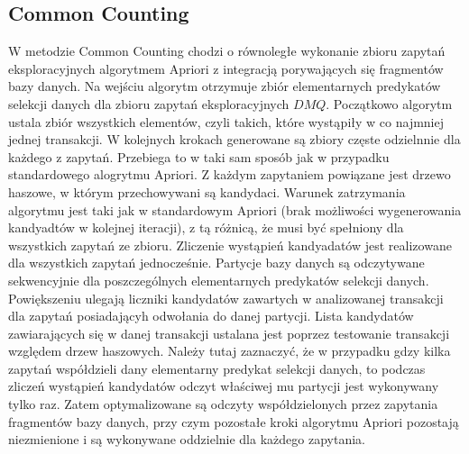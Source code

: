 \subsection{Common Counting \cite{WojciechowskiCC}}
\label{c325}
W metodzie Common Counting chodzi o równoległe wykonanie zbioru zapytań eksploracyjnych algorytmem Apriori z integracją porywających się fragmentów bazy danych. Na wejściu algorytm otrzymuje zbiór elementarnych predykatów selekcji danych dla zbioru zapytań eksploracyjnych \(DMQ\). Początkowo algorytm ustala zbiór wszystkich elementów, czyli takich, które wystąpiły w co najmniej jednej transakcji. W kolejnych krokach generowane są zbiory częste odzielnnie dla każdego z zapytań. Przebiega to w taki sam sposób jak w przypadku standardowego alogrytmu Apriori. Z każdym zapytaniem powiązane jest drzewo haszowe, w którym przechowywani są kandydaci. Warunek zatrzymania algorytmu jest taki jak w standardowym Apriori (brak możliwości wygenerowania kandyadtów w kolejnej iteracji), z tą różnicą, że musi być spełniony dla wszystkich zapytań ze zbioru. 
Zliczenie wystąpień kandyadatów jest realizowane dla wszystkich zapytań jednocześnie. Partycje bazy danych są odczytywane sekwencyjnie dla poszczególnych elementarnych predykatów selekcji danych. Powiększeniu ulegają liczniki kandydatów zawartych w analizowanej transakcji dla zapytań posiadającyh odwołania do danej partycji. Lista kandydatów zawiarających się w danej transakcji ustalana jest poprzez testowanie transakcji względem drzew haszowych. Należy tutaj zaznaczyć, że w przypadku gdzy kilka zapytań współdzieli dany elementarny predykat selekcji danych, to podczas zliczeń wystąpień kandydatów odczyt właściwej mu partycji jest wykonywany tylko raz. Zatem optymalizowane są odczyty współdzielonych przez zapytania fragmentów bazy danych, przy czym pozostałe kroki algorytmu Apriori pozostają niezmienione i są wykonywane oddzielnie dla każdego zapytania. 

